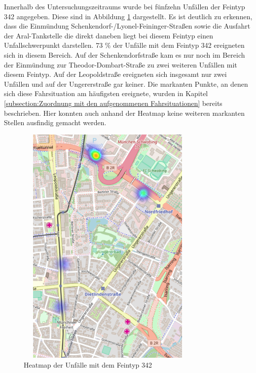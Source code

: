Innerhalb des Untersuchungszeitraums wurde bei fünfzehn Unfällen der Feintyp 342 angegeben. Diese sind in Abbildung \ref{fig:Heatmap_342} dargestellt. Es ist deutlich zu erkennen, dass die Einmündung Schenkendorf-/Lyonel-Feininger-Straßen sowie die Ausfahrt der Aral-Tankstelle die direkt daneben liegt bei diesem Feintyp einen Unfallschwerpunkt darstellen. 73 \% der Unfälle mit dem Feintyp 342 ereigneten sich in diesem Bereich. Auf der Schenkendorfstraße kam es nur noch im Bereich der Einmündung zur Theodor-Dombart-Straße zu zwei weiteren Unfällen mit diesem Feintyp. Auf der Leopoldstraße ereigneten sich insgesamt nur zwei Unfällen und auf der Ungererstraße gar keiner. Die markanten Punkte, an denen sich diese Fahrsituation am häufigsten ereignete, wurden in Kapitel \ref{subsection:Zuordnung mit den aufgenommenen Fahrsituationen} bereits beschrieben. Hier konnten auch anhand der Heatmap keine weiteren markanten Stellen ausfindig gemacht werden.

\begin{savenotes}
	\begin{figure}[H]
		\centering
		\includegraphics[width=9cm,height=12cm]{figures/HM_342}
		\caption[Heatmap der Unfälle mit dem Feintyp 342]{Heatmap der Unfälle mit dem Feintyp 342}\label{fig:Heatmap_342}
	\end{figure}
\end{savenotes}

